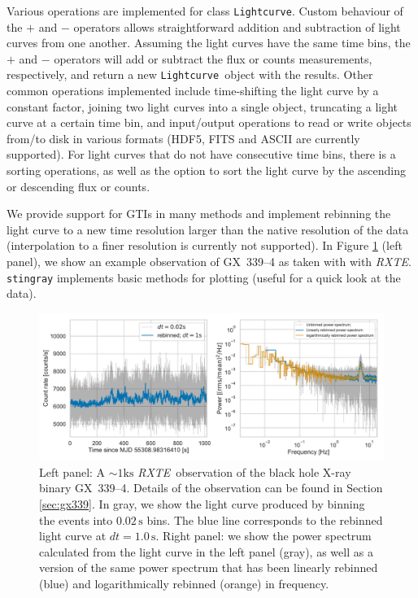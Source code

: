 \documentclass[twocolumn]{aastex62}
\newcommand{\project}[1]{\textsl{#1}\xspace}
\newcommand{\rxte}{\project{RXTE}\xspace}
\newcommand{\stingray}{\texttt{stingray}\xspace}
\newcommand{\lightcurve}{\texttt{Lightcurve}\xspace}
\begin{document}
Various operations are implemented for class \lightcurve. 
Custom behaviour of the $+$ and $-$ operators allows straightforward addition and subtraction of light curves from one another. 
Assuming the light curves have the same time bins, the $+$ and $-$ operators will add or subtract the flux or counts measurements, respectively, and return a new \lightcurve\ object with the results. 
Other common operations implemented include time-shifting the light curve by a constant factor, joining two light curves into a single object, truncating a light curve at a certain time bin, and input/output operations to read or write objects from/to disk in various formats (HDF5, FITS and ASCII are currently supported). 
For light curves that do not have consecutive time bins, there is a sorting operations, as well as the option to sort the light curve by the ascending or descending flux or counts. 

We provide support for GTIs in many methods and implement rebinning the light curve to a new time resolution larger than the native resolution of the data (interpolation to a finer resolution is currently not supported). 
In Figure \ref{fig:psd} (left panel), we show an example observation of GX~339--4 as taken with with \rxte.
\stingray implements basic methods for plotting (useful for a quick look at the data).

\begin{figure}[htbp]
\begin{center}
\includegraphics[width=\textwidth]{../figures/example_lc_ps.pdf}
\caption{Left panel: A $\sim 1 \mathrm{ks}$ \rxte\ observation of the black hole X-ray binary GX~339--4. 
Details of the observation can be found in Section \ref{sec:gx339}. 
In gray, we show the light curve produced by binning the events into $0.02\,\mathrm{s}$ bins. 
The blue line corresponds to the rebinned light curve at $dt = 1.0\,\mathrm{s}$. 
Right panel: we show the power spectrum calculated from the light curve in the left panel (gray), as well as a version of the same power spectrum that has been linearly rebinned (blue) and logarithmically rebinned (orange) in frequency.}
\label{fig:psd}
\end{center}
\end{figure}
\end{document}
